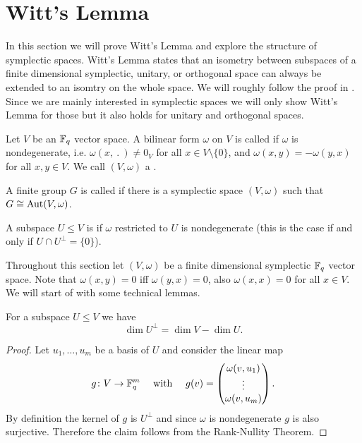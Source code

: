 \section{Witt's Lemma}\label{sec:witt}
In this section we will prove Witt's Lemma and explore the structure of symplectic spaces. Witt's Lemma states that an isometry between subspaces of a finite dimensional symplectic, unitary, or orthogonal space can always be extended to an isomtry on the whole space.  We will roughly follow the proof in \cite{Witt}. Since we are mainly interested in symplectic spaces we will only show Witt's Lemma for those but it also holds for unitary and orthogonal spaces.
		
\begin{definition}
	Let $V$ be an $\mathbb{F}_q$ vector space. A bilinear form $\omega$ on $V$ is called  if $\omega$ is nondegenerate, i.e. $\omega(x,\ .\ )\not=0_V$ for all $x\in V\setminus\{0\}$, and $\omega(x,y)=-\omega(y,x)$ for all $x,y\in V$. We call $(V,\omega)$ a .
				
	A finite group $G$ is called  if there is a symplectic space $(V,\omega)$ such that $G\cong\operatorname{Aut}(V,\omega)$. 
				
	A subspace $U\leq V$ is  if $\omega$ restricted to $U$ is nondegenerate (this is the case if and only if $U\cap U^\bot=\{0\}$). 
				
\end{definition}
Throughout this section let $(V,\omega)$ be a finite dimensional symplectic $\mathbb{F}_q$ vector space.
Note that $\omega(x,y)=0$ iff $\omega(y,x)=0$, also $\omega(x,x)=0$ for all $x\in V$.
We will start of with some technical lemmas.
		
		
		
\begin{lemma}\label{lem:dimUBot}
	For a subspace $U\leq V$ we have 
	\[\dim U^\bot= \dim V -\dim U.\]
\end{lemma}
\begin{proof}
	Let $u_1,\dots,u_m$ be a basis of $U$ and consider the linear map
	\begin{align*}g\colon V\to \mathbb{F}_q^m&&\text{ with }&&g(v)=
		\begin{pmatrix} 
		\omega(v,u_1)   \\
		\vdots          \\
		\omega(v,u_m)   
		\end{pmatrix}.  
	\end{align*}
	By definition the kernel of $g$ is $U^\bot$ and since $\omega$ is nondegenerate $g$ is also surjective. Therefore the claim follows from the Rank-Nullity Theorem.
\end{proof}
		
